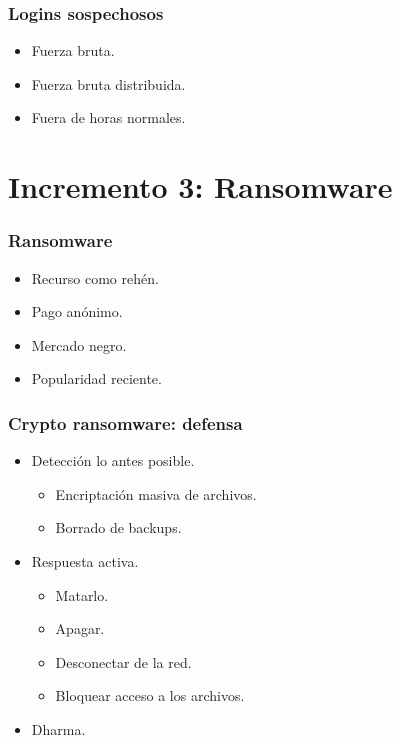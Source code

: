 \documentclass[a4paper,10pt]{beamer}
\begin{document}
\begin{frame}[fragile]
	\frametitle{Logins sospechosos} %

	\begin{itemize}
		\item Fuerza bruta. 				%
		\item Fuerza bruta distribuida. 	%
		\item Fuera de horas normales. 		%
	\end{itemize}
\end{frame}

\section{Incremento 3: Ransomware}
\begin{frame}[fragile]
	\frametitle{Ransomware}

	\begin{itemize}
		\item Recurso como rehén. %
		\item Pago anónimo. %
		\item Mercado negro. %
		\item Popularidad reciente. %
	\end{itemize}
\end{frame}

\begin{frame}[fragile]
	\frametitle{Crypto ransomware: defensa}

	\begin{itemize}
		\item Detección lo antes posible.
		\begin{itemize}
			\item Encriptación masiva de archivos. %
			\item Borrado de backups. %
		\end{itemize}
		\item Respuesta activa. %
		\begin{itemize}
			\item Matarlo.
			\item Apagar.
			\item Desconectar de la red.
			\item Bloquear acceso a los archivos.
		\end{itemize}
		\item Dharma.
	\end{itemize}
\end{frame}
\end{document}
